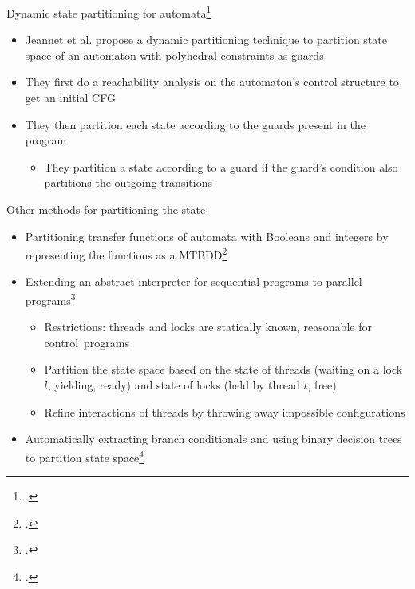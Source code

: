 \documentclass[aspectratio=169]{beamer}
\begin{document}
\begin{frame}{Dynamic state partitioning for automata\footcite{jeannet_dynamic_1999}}
  \begin{itemize}[<+->]
  \item Jeannet et al. propose a dynamic partitioning technique to partition state space of an automaton with polyhedral constraints as guards
  \item They first do a reachability analysis on the automaton's control structure to get an initial CFG
  \item They then partition each state according to the guards present in the program
    \begin{itemize}
    \item They partition a state according to a guard if the guard's condition also partitions the outgoing transitions
    \end{itemize}
  \end{itemize}
\end{frame}

\begin{frame}{Other methods for partitioning the state}
  \begin{itemize}[<+->]
  \item Partitioning transfer functions of automata with Booleans and integers by representing the functions as a MTBDD\footcite{jeannet_representing_2002}
  \item Extending an abstract interpreter for sequential programs to parallel programs\footcite{mine2011static}
    \begin{itemize}
    \item Restrictions: threads and locks are statically known, reasonable for control~programs
    \item Partition the state space based on the state of threads (waiting on a lock $l$, yielding, ready) and state of locks (held by thread $t$, free)
    \item Refine interactions of threads by throwing away impossible configurations
    \end{itemize}
  \item Automatically extracting branch conditionals and using binary decision trees to partition state space\footcite{chen2015binary}
  \end{itemize}
\end{frame}
\end{document}
